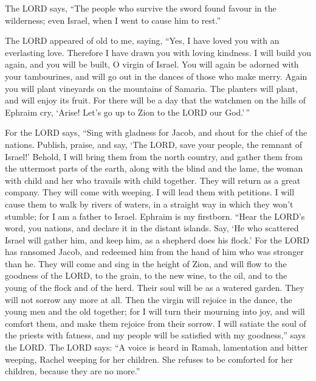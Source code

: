  The LORD says, ``The people who survive the sword found
favour in the wilderness; even Israel, when I went to cause him to
rest.''

 The LORD appeared of old to me, saying, ``Yes, I have
loved you with an everlasting love. Therefore I have drawn you with
loving kindness.  I will build you again, and you will be
built, O virgin of Israel. You will again be adorned with your
tambourines, and will go out in the dances of those who make merry.
 Again you will plant vineyards on the mountains of
Samaria. The planters will plant, and will enjoy its fruit.
 For there will be a day that the watchmen on the hills of
Ephraim cry, `Arise! Let's go up to Zion to the LORD our God.'\,''

 For the LORD says, ``Sing with gladness for Jacob, and
shout for the chief of the nations. Publish, praise, and say, `The LORD,
save your people, the remnant of Israel!'  Behold, I will
bring them from the north country, and gather them from the uttermost
parts of the earth, along with the blind and the lame, the woman with
child and her who travails with child together. They will return as a
great company.  They will come with weeping. I will lead
them with petitions. I will cause them to walk by rivers of waters, in a
straight way in which they won't stumble; for I am a father to Israel.
Ephraim is my firstborn.  ``Hear the LORD's word, you
nations, and declare it in the distant islands. Say, `He who scattered
Israel will gather him, and keep him, as a shepherd does his flock.'
 For the LORD has ransomed Jacob, and redeemed him from
the hand of him who was stronger than he.  They will come
and sing in the height of Zion, and will flow to the goodness of the
LORD, to the grain, to the new wine, to the oil, and to the young of the
flock and of the herd. Their soul will be as a watered garden. They will
not sorrow any more at all.  Then the virgin will rejoice
in the dance, the young men and the old together; for I will turn their
mourning into joy, and will comfort them, and make them rejoice from
their sorrow.  I will satiate the soul of the priests
with fatness, and my people will be satisfied with my goodness,'' says
the LORD.  The LORD says: ``A voice is heard in Ramah,
lamentation and bitter weeping, Rachel weeping for her children. She
refuses to be comforted for her children, because they are no more.''

